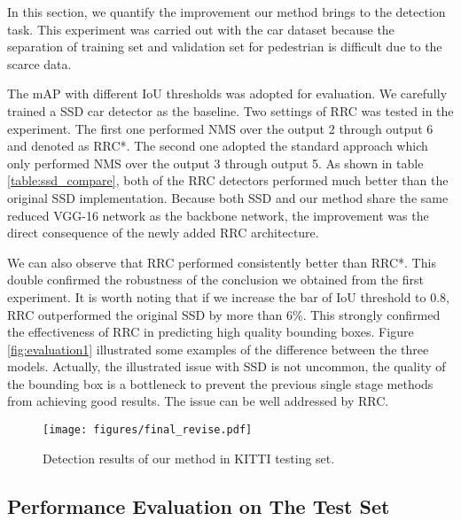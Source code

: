 \documentclass[10pt,twocolumn,letterpaper]{article}
\begin{document}
In this section, we quantify the improvement our method brings to the detection task. This experiment was carried out with the car dataset because the separation of training set and validation set for pedestrian is difficult due to the scarce data.

The mAP with different IoU thresholds was adopted for evaluation. We carefully trained a SSD car detector as the baseline. Two settings of RRC was tested in the experiment. The first one performed NMS over the output 2 through output 6 and denoted as RRC*. The second one adopted the standard approach which only performed NMS over the output 3 through output 5. As shown in table \ref{table:ssd_compare}, both of the RRC detectors performed much better than the original SSD implementation. Because both SSD and our method share the same reduced VGG-16 network as the backbone network, the improvement was the direct consequence of the newly added RRC architecture.

We can also observe that RRC performed consistently better than RRC*. This double confirmed the robustness of the conclusion we obtained from the first experiment. It is worth noting that if we increase the bar of IoU threshold to 0.8, RRC outperformed the original SSD by more than 6\%. This strongly confirmed the effectiveness of RRC in predicting high quality bounding boxes. Figure \ref{fig:evaluation1} illustrated some examples of the difference between the three models. Actually, the illustrated issue with SSD is not uncommon, the quality of the bounding box is a bottleneck to prevent the previous single stage methods from achieving good results. The issue can be well addressed by RRC.


\begin{figure*}[thb!]
  \texttt{[image: figures/final\_revise.pdf]}
  \caption{Detection results of our method in KITTI testing set.}
  \label{fig:final}
\end{figure*}

\subsection{Performance Evaluation on The Test Set}
\end{document}
